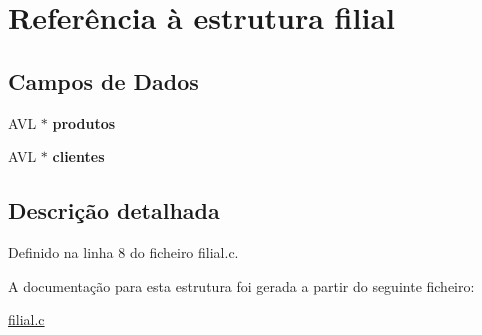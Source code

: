 \hypertarget{structfilial}{}\section{Referência à estrutura filial}
\label{structfilial}
\subsection*{Campos de Dados}
\begin{DoxyCompactItemize}
\item 
\mbox{\label{structfilial_ae371534200014f23d71ad1afb39022fc}} 
A\+VL $\ast$ {\bfseries produtos}
\item 
\mbox{\label{structfilial_a39d666f25371d36adde339413efdfe3e}} 
A\+VL $\ast$ {\bfseries clientes}
\end{DoxyCompactItemize}


\subsection{Descrição detalhada}


Definido na linha 8 do ficheiro filial.\+c.



A documentação para esta estrutura foi gerada a partir do seguinte ficheiro\+:\begin{DoxyCompactItemize}
\item 
\hyperlink{filial_8c}{filial.\+c}\end{DoxyCompactItemize}
